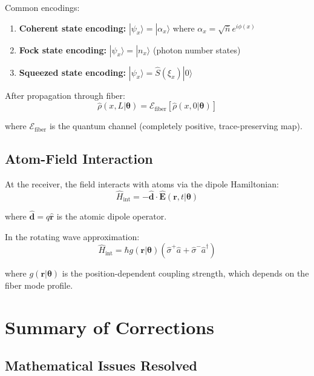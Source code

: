 \documentclass[12pt,a4paper]{article}
\begin{document}
Common encodings:
\begin{enumerate}
\item \textbf{Coherent state encoding:} $|\psi_x\rangle = |\alpha_x\rangle$ where $\alpha_x = \sqrt{\bar{n}} e^{i\phi(x)}$
\item \textbf{Fock state encoding:} $|\psi_x\rangle = |n_x\rangle$ (photon number states)
\item \textbf{Squeezed state encoding:} $|\psi_x\rangle = \hat{S}(\xi_x)|0\rangle$
\end{enumerate}

After propagation through fiber:
\begin{equation}
\hat{\rho}(x, L|\boldsymbol{\theta}) = \mathcal{E}_{\text{fiber}}[\hat{\rho}(x, 0|\boldsymbol{\theta})]
\end{equation}

where $\mathcal{E}_{\text{fiber}}$ is the quantum channel (completely positive, trace-preserving map).

\subsection{Atom-Field Interaction}

At the receiver, the field interacts with atoms via the dipole Hamiltonian:
\begin{equation}
\hat{H}_{\text{int}} = -\hat{\mathbf{d}} \cdot \hat{\mathbf{E}}(\mathbf{r}, t|\boldsymbol{\theta})
\end{equation}

where $\hat{\mathbf{d}} = q\hat{\mathbf{r}}$ is the atomic dipole operator.

In the rotating wave approximation:
\begin{equation}
\hat{H}_{\text{int}} = \hbar g(\mathbf{r}|\boldsymbol{\theta})(\hat{\sigma}^+ \hat{a} + \hat{\sigma}^- \hat{a}^\dagger)
\end{equation}

where $g(\mathbf{r}|\boldsymbol{\theta})$ is the position-dependent coupling strength, which depends on the fiber mode profile.

\section{Summary of Corrections}

\subsection{Mathematical Issues Resolved}
\end{document}
